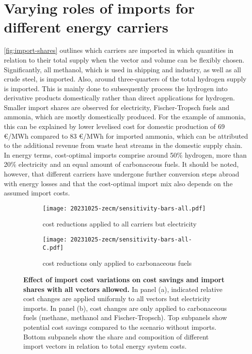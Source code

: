 
\section*{Varying roles of imports for different energy carriers}

\cref{fig:import-shares} outlines which carriers are imported in which
quantities in relation to their total supply when the vector and volume can be
flexibly chosen. Significantly, all methanol, which is used in shipping and
industry, as well as all crude steel, is imported. Also, around three-quarters
of the total hydrogen supply is imported. This is mainly done to subsequently
process the hydrogen into derivative products domestically rather than direct
applications for hydrogen. Smaller import shares are observed for electricity,
Fischer-Tropsch fuels and ammonia, which are mostly domestically produced. For
the example of ammonia, this can be explained by lower levelised cost for
domestic production of 69 \euro{}/MWh compared to 83 \euro{}/MWh for imported
ammonia, which can be attributed to the additional revenue from waste heat
streams in the domestic supply chain. In energy terms, cost-optimal imports
comprise around 50\% hydrogen, more than 20\% electricity and an equal amount of
carbonaceous fuels. It should be noted, however, that different carriers have
undergone further conversion steps abroad with energy losses and that the
cost-optimal import mix also depends on the assumed import costs.


\begin{figure*}
    \begin{subfigure}[t]{\columnwidth}
        \caption{cost reductions applied to all carriers but electricity}
        \label{fig:sensitivity-costs:A}
        \texttt{[image: 20231025-zecm/sensitivity-bars-all.pdf]}
    \end{subfigure}
    \begin{subfigure}[t]{\columnwidth}
        \caption{cost reductions only applied to carbonaceous fuels}
        \label{fig:sensitivity-costs:B}
        \texttt{[image: 20231025-zecm/sensitivity-bars-all-C.pdf]}
    \end{subfigure}
    \caption{\textbf{Effect of import cost variations on cost savings and import shares with all vectors allowed.}
    In panel (a), indicated relative cost changes are applied uniformly to all vectors but electricity imports.
    In panel (b), cost changes are only applied to carbonaceous fuels (methane, methanol and Fischer-Tropsch).
    Top subpanels show potential cost savings compared to the scenario without imports.
    Bottom subpanels show the share and composition of different import vectors in relation to total energy system costs.
    }
    \label{fig:sensitivity-costs}
\end{figure*}

